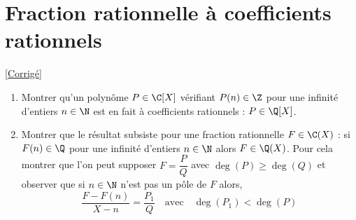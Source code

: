 \documentclass{book}
\begin{document}
	\section{Fraction rationnelle à coefficients rationnels }
	\textcolor{blue}{\hyperref[Fraction rationnelle à coefficients rationnels corrigé]{[Corrigé]}}\\
	\label{Fraction rationnelle à coefficients rationnels}
	\begin{enumerate}[leftmargin=*]
		\item Montrer qu'un polynôme $P\in \C[X]$ vérifiant $P(n)\in \Z$ pour une infinité d'entiers $n\in \N$ est en fait à coefficients rationnels : $P\in \Q[X]$.
		\item Montrer que le résultat subsiste pour une fraction rationnelle $F\in \C(X)$ : si $F(n)\in \Q$ pour une infinité d'entiers $n\in \N$ alors $F\in \Q(X)$. Pour cela montrer que l'on peut supposer $F=\dfrac{P}{Q}$ avec $\deg(P)\geq \deg(Q)$ et observer que si $n\in \N$ n'est pas un pôle de $F$ alors,
		$$\frac{F-F(n)}{X-n}=\frac{P_1}{Q}\quad\text{avec}\quad\deg(P_1)<\deg(P)$$
	\end{enumerate}
	
\end{document}
